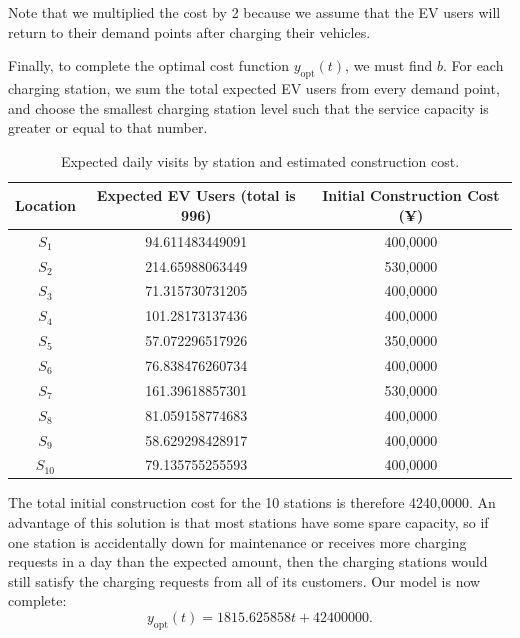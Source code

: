 \documentclass[10pt]{article}
\begin{document}
Note that we multiplied the cost by 2 because we assume that the EV users will return to their demand points after charging their vehicles.

Finally, to complete the optimal cost function $y_\text{opt}(t)$, we must find $b$. For each charging station, we sum the total expected EV users from every demand point, and choose the smallest charging station level such that the service capacity is greater or equal to that number.\newline

{\renewcommand{\arraystretch}{1.9}%
\begin{table}[htbp]
    \centering
    \begin{tabular}{c|c|c}
        Location & Expected EV Users (total is 996) & Initial Construction Cost (¥) \\
        \hline
        $S_1$ & 94.611483449091 & 400,0000 \\
        \hline
        $S_2$ & 214.65988063449 & 530,0000 \\
        \hline
        $S_3$ & 71.315730731205 & 400,0000 \\
        \hline
        $S_4$ & 101.28173137436 & 400,0000 \\
        \hline
        $S_5$ & 57.072296517926 & 350,0000 \\
        \hline
        $S_6$ & 76.838476260734 & 400,0000 \\
        \hline
        $S_7$ & 161.39618857301 & 530,0000 \\
        \hline
        $S_8$ & 81.059158774683 & 400,0000 \\
        \hline
        $S_9$ & 58.629298428917 & 400,0000 \\
        \hline
        $S_{10}$ & 79.135755255593 & 400,0000
    \end{tabular}
    \caption{Expected daily visits by station and estimated construction cost.\newline}
    \label{tab:dist_cost}
\end{table}}

The total initial construction cost for the 10 stations is therefore 4240,0000. An advantage of this solution is that most stations have some spare capacity, so if one station is accidentally down for maintenance or receives more charging requests in a day than the expected amount, then the charging stations would still satisfy the charging requests from all of its customers. Our model is now complete: $$y_\text{opt}(t) = 1815.625858t + 42400000.$$
\end{document}
